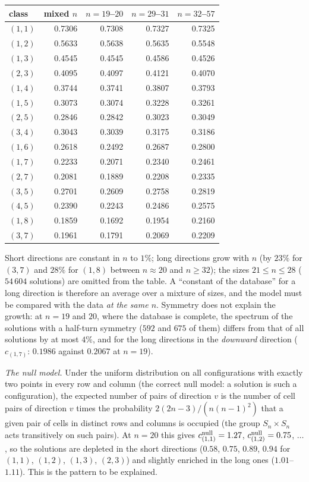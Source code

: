 \documentclass[11pt,a4paper]{article}
\begin{document}
\begin{center}\begin{tabular}{lrrrr}\toprule
class & mixed $n$ & $n=19$--$20$ & $n=29$--$31$ & $n=32$--$57$\\\midrule
$(1,1)$ & 0.7306 & 0.7308 & 0.7327 & 0.7325\\
$(1,2)$ & 0.5633 & 0.5638 & 0.5635 & 0.5548\\
$(1,3)$ & 0.4545 & 0.4545 & 0.4586 & 0.4526\\
$(2,3)$ & 0.4095 & 0.4097 & 0.4121 & 0.4070\\
$(1,4)$ & 0.3744 & 0.3741 & 0.3807 & 0.3793\\
$(1,5)$ & 0.3073 & 0.3074 & 0.3228 & 0.3261\\
$(2,5)$ & 0.2846 & 0.2842 & 0.3023 & 0.3049\\
$(3,4)$ & 0.3043 & 0.3039 & 0.3175 & 0.3186\\
$(1,6)$ & 0.2618 & 0.2492 & 0.2687 & 0.2800\\
$(1,7)$ & 0.2233 & 0.2071 & 0.2340 & 0.2461\\
$(2,7)$ & 0.2081 & 0.1889 & 0.2208 & 0.2335\\
$(3,5)$ & 0.2701 & 0.2609 & 0.2758 & 0.2819\\
$(4,5)$ & 0.2390 & 0.2243 & 0.2486 & 0.2575\\
$(1,8)$ & 0.1859 & 0.1692 & 0.1954 & 0.2160\\
$(3,7)$ & 0.1961 & 0.1791 & 0.2069 & 0.2209\\
\bottomrule
\end{tabular}\end{center}
Short directions are constant in $n$ to $1\%$; long directions grow with $n$ (by $23\%$ for $(3,7)$ and $28\%$ for
$(1,8)$ between $n\approx20$ and $n\ge32$); the sizes $21\le n\le28$ ($54\,604$ solutions) are omitted from the table.  A ``constant of the database'' for a long direction is therefore an average over a mixture
of sizes, and the model must be compared with the data \emph{at the same $n$}.  Symmetry does not explain the growth:
at $n=19$ and $20$, where the database is complete, the spectrum of the solutions with a half-turn symmetry
($592$ and $675$ of them) differs from that of all solutions by at most $4\%$, and for the long directions in the
\emph{downward} direction ($c_{(1,7)}$: $0.1986$ against $0.2067$ at $n=19$).

\emph{The null model.}  Under the uniform distribution on all configurations with exactly two points in every row
and column (the correct null model: a solution is such a configuration), the expected number of pairs of direction
$v$ is the number of cell pairs of direction $v$ times the probability $2(2n-3)/(n(n-1)^2)$ that a given pair of cells
in distinct rows and columns is occupied (the group $S_n\times S_n$ acts transitively on such pairs).  At $n=20$ this
gives $c^{\rm null}_{(1,1)}=1.27$, $c^{\rm null}_{(1,2)}=0.75$, $\dots$, so the solutions are depleted in the short
directions ($0.58$, $0.75$, $0.89$, $0.94$ for $(1,1)$, $(1,2)$, $(1,3)$, $(2,3)$) and slightly enriched in the long ones
($1.01$--$1.11$).  This is the pattern to be explained.
\end{document}
